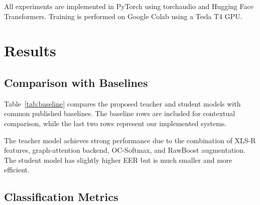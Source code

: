 \documentclass[sigconf]{acmart}
\begin{document}
All experiments are implemented in PyTorch using torchaudio and Hugging Face Transformers. Training is performed on Google Colab using a Tesla T4 GPU.

\section{Results}

\subsection{Comparison with Baselines}

Table~\ref{tab:baseline} compares the proposed teacher and student models with common published baselines. The baseline rows are included for contextual comparison, while the last two rows represent our implemented systems.

\begin{table}[h]
\centering
\caption{Comparison with published baselines on ASVspoof 2019 LA.}
\label{tab:baseline}
\end{table}

The teacher model achieves strong performance due to the combination of XLS-R features, graph-attention backend, OC-Softmax, and RawBoost augmentation. The student model has slightly higher EER but is much smaller and more efficient.

\subsection{Classification Metrics}
\end{document}
